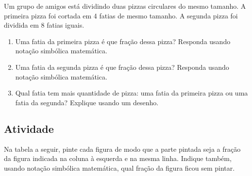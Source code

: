 Um grupo de amigos está dividindo duas pizzas circulares do mesmo tamanho. A primeira pizza foi cortada em 4 fatias de mesmo tamanho. A segunda pizza foi dividida em 8 fatias iguais.

\begin{enumerate} [\quad a)] %
  \item     Uma fatia da primeira pizza é que fração dessa pizza? Responda usando notação simbólica matemática.
  \item     Uma fatia da segunda pizza é que fração dessa pizza? Responda usando notação simbólica matemática.
  \item     Qual fatia tem mais quantidade de pizza: uma fatia da primeira pizza ou uma fatia da segunda? Explique usando um desenho.
\end{enumerate} %


\subsection{Atividade}

Na tabela a seguir, pinte cada figura de modo que a parte pintada seja a fração da figura indicada na coluna à esquerda e na mesma linha. Indique também, usando notação simbólica matemática, qual fração da figura ficou sem pintar.

